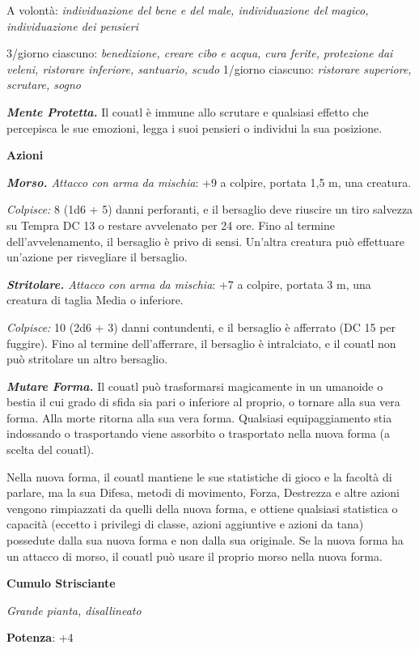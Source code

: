 \begin{multicols}{2}
A volontà: \emph{individuazione del bene e del male, individuazione del}
\emph{magico, individuazione dei pensieri}

3/giorno ciascuno: \emph{benedizione, creare cibo e acqua, cura ferite,}
\emph{protezione dai veleni, ristorare inferiore, santuario, scudo}
1/giorno ciascuno: \emph{ristorare superiore, scrutare, sogno}

\emph{\textbf{Mente Protetta.}} Il couatl è immune allo scrutare e
qualsiasi effetto che percepisca le sue emozioni, legga i suoi pensieri
o individui la sua posizione.

\textbf{Azioni}

\emph{\textbf{Morso.} Attacco con arma da mischia}: +9 a colpire,
portata 1,5 m, una creatura.

\emph{Colpisce:} 8 (1d6 + 5) danni perforanti, e il bersaglio deve
riuscire un tiro salvezza su Tempra DC 13 o restare avvelenato per
24 ore. Fino al termine dell'avvelenamento, il bersaglio è privo di
sensi. Un'altra creatura può effettuare un'azione per risvegliare il
bersaglio.

\emph{\textbf{Stritolare.} Attacco con arma da mischia}: +7 a colpire,
portata 3 m, una creatura di taglia Media o inferiore.

\emph{Colpisce:} 10 (2d6 + 3) danni contundenti, e il bersaglio è
afferrato (DC 15 per fuggire). Fino al termine dell'afferrare, il
bersaglio è intralciato, e il couatl non può stritolare un altro
bersaglio.

\emph{\textbf{Mutare Forma.}} Il couatl può trasformarsi magicamente in
un umanoide o bestia il cui grado di sfida sia pari o inferiore al
proprio, o tornare alla sua vera forma. Alla morte ritorna alla sua vera
forma. Qualsiasi equipaggiamento stia indossando o trasportando viene
assorbito o trasportato nella nuova forma (a scelta del couatl).

Nella nuova forma, il couatl mantiene le sue statistiche di gioco e la
facoltà di parlare, ma la sua Difesa, metodi di movimento, Forza, Destrezza
e altre azioni vengono rimpiazzati da quelli della nuova forma, e
ottiene qualsiasi statistica o capacità (eccetto i privilegi di classe,
azioni aggiuntive e azioni da tana) possedute dalla sua nuova forma e
non dalla sua originale. Se la nuova forma ha un attacco di morso, il
couatl può usare il proprio morso nella nuova forma.

\textbf{Cumulo Strisciante}

\emph{Grande pianta, disallineato}

\textbf{Potenza}: +4


\end{multicols}
